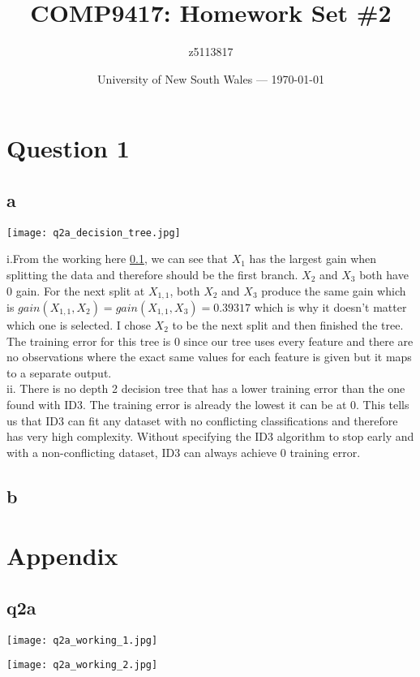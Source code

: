 \documentclass{article}
\title{COMP9417: Homework Set \#2} %
\author{z5113817} %
\date{University of New South Wales --- \today} %
\begin{document}




\section*{Question 1}

\subsection*{a}

\texttt{[image: q2a\_decision\_tree.jpg]}

i.From the working here \ref{working:2a}, we can see that \(X_{1}\) has the largest gain when splitting the data and therefore
should be the first branch. \(X_{2}\) and \(X_{3}\) both have 0 gain. For the next split at \(X_{1,1}\), both \(X_{2}\) and \(X_{3}\)
produce the same gain which is \(gain(X_{1,1}, X_{2}) = gain(X_{1,1}, X_{3}) = 0.39317\) which is why it doesn't matter which one is selected.
I chose \(X_{2}\) to be the next split and then finished the tree.\\

The training error for this tree is 0 since our tree uses every feature and there are no observations where the exact same
values for each feature is given but it maps to a separate output.\\

ii. There is no depth 2 decision tree that has a lower training error than the one found with ID3.
The training error is already the lowest it can be at 0. This tells us that ID3 can fit any dataset
with no conflicting classifications and therefore has very high complexity. Without specifying the ID3 algorithm to 
stop early and with a non-conflicting dataset, ID3 can always achieve 0 training error. 

\subsection*{b}


\newpage
\section*{Appendix}

\subsection{q2a}
\label{working:2a}
\texttt{[image: q2a\_working\_1.jpg]}

\newpage
\texttt{[image: q2a\_working\_2.jpg]}
\end{document}
